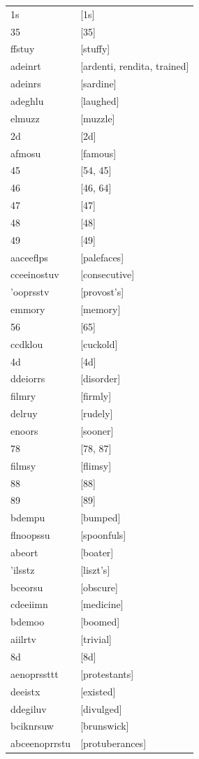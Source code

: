 \documentclass{article}
\begin{document}
\begin{tabular}{ll}
1s & [1s] \\
35 & [35] \\
ffstuy & [stuffy] \\
adeinrt & [ardenti, rendita, trained] \\
adeinrs & [sardine] \\
adeghlu & [laughed] \\
elmuzz & [muzzle] \\
2d & [2d] \\
afmosu & [famous] \\
45 & [54, 45] \\
46 & [46, 64] \\
47 & [47] \\
48 & [48] \\
49 & [49] \\
aaceeflps & [palefaces] \\
cceeinostuv & [consecutive] \\
'ooprsstv & [provost's] \\
emmory & [memory] \\
56 & [65] \\
ccdklou & [cuckold] \\
4d & [4d] \\
ddeiorrs & [disorder] \\
filmry & [firmly] \\
delruy & [rudely] \\
enoors & [sooner] \\
78 & [78, 87] \\
filmsy & [flimsy] \\
88 & [88] \\
89 & [89] \\
bdempu & [bumped] \\
flnoopssu & [spoonfuls] \\
abeort & [boater] \\
'ilsstz & [liszt's] \\
bceorsu & [obscure] \\
cdeeiimn & [medicine] \\
bdemoo & [boomed] \\
aiilrtv & [trivial] \\
8d & [8d] \\
aenoprssttt & [protestants] \\
deeistx & [existed] \\
ddegiluv & [divulged] \\
bciknrsuw & [brunswick] \\
abceenoprrstu & [protuberances] \\

\end{tabular}
\end{document}
